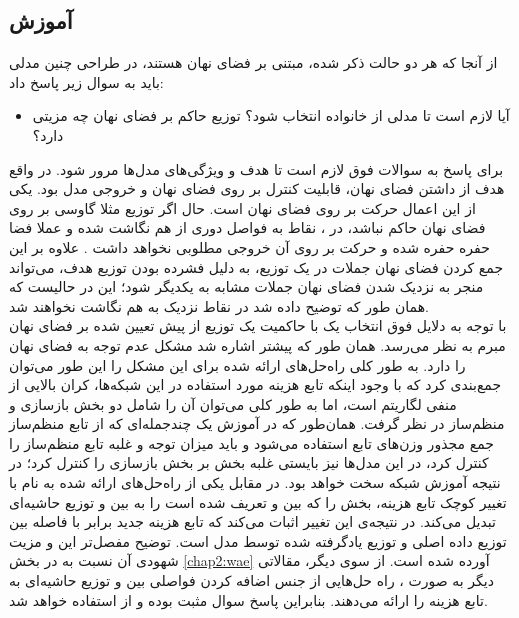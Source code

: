 \subsection{آموزش \autoencoder{}} \label{chap3:wae_training}
از آنجا که هر دو حالت ذکر شده، مبتنی بر فضای نهان هستند، در طراحی چنین مدلی باید به سوال زیر پاسخ داد:
\begin{itemize}
    \item
    آیا لازم است تا مدلی از خانواده \vae{}  انتخاب شود؟ توزیع حاکم بر فضای نهان چه مزیتی دارد؟
\end{itemize}
برای پاسخ به سوالات فوق لازم است تا هدف و ویژگی‌های مدل‌ها مرور شود. در واقع هدف از داشتن فضای نهان، قابلیت کنترل بر روی فضای نهان و خروجی مدل بود. یکی از این اعمال حرکت بر روی فضای نهان است. حال اگر توزیع مثلا گاوسی بر روی فضای نهان حاکم نباشد، در \autoencoder{}، نقاط به فواصل دوری از هم نگاشت شده و عملا فضا حفره حفره شده و حرکت بر روی آن خروجی مطلوبی نخواهد داشت \cite{infovae}. علاوه بر این جمع کردن فضای نهان جملات در یک توزیع، به دلیل فشرده بودن توزیع هدف، می‌تواند منجر به نزدیک شدن فضای نهان جملات مشابه به یکدیگر شود؛ این در حالیست که همان طور که توضیح داده شد در   \autoencoder{} نقاط نزدیک به هم نگاشت نخواهند شد.
\\
با توجه به دلایل فوق انتخاب یک \autoencoder{} با حاکمیت یک توزیع از پیش تعیین شده بر فضای نهان مبرم به نظر می‌رسد. همان طور که پیشتر اشاره شد \vae{} مشکل عدم توجه به فضای نهان را دارد. به طور کلی راه‌حل‌های ارائه شده برای این مشکل را این طور  می‌توان جمع‌بندی کرد که با وجود اینکه تابع هزینه مورد استفاده در این شبکه‌ها، کران بالایی از منفی لگاریتم \likelihood{} است، اما به طور کلی می‌توان آن را شامل دو بخش بازسازی و منظم‌ساز در نظر گرفت. همان‌طور که در آموزش یک چندجمله‌ای که از تابع منظم‌ساز جمع مجذور وزن‌های تابع استفاده می‌شود و باید میزان توجه و غلبه تابع منظم‌ساز را کنترل کرد، در این مدل‌ها نیز بایستی غلبه بخش  بر بخش بازسازی را کنترل کرد؛ در نتیجه آموزش شبکه سخت خواهد بود. در مقابل یکی از راه‌حل‌های ارائه شده به نام \wae{} با تغییر کوچک تابع هزینه، بخش  را که بین \priordist{} و \posteriordist{} تعریف شده است را به  بین \priordist{} و توزیع حاشیه‌ای \posterior{} تبدیل می‌کند. در نتیجه‌ی این تغییر اثبات می‌کند که تابع هزینه جدید برابر با فاصله \wasser{} بین توزیع داده اصلی و توزیع یادگرفته شده توسط مدل است. توضیح مفصل‌تر این \autoencoder{} و مزیت شهودی آن نسبت به \vae{} در بخش \ref{chap2:wae} آورده شده است.
از سوی دیگر، مقالاتی دیگر به صورت \huristic{}، راه حل‌هایی از جنس اضافه کردن فواصلی بین \priordist{} و توزیع حاشیه‌ای \posterior{} به تابع هزینه \vae{} را ارائه می‌دهند.  بنابراین پاسخ سوال مثبت بوده و از \wae{} استفاده خواهد شد.


